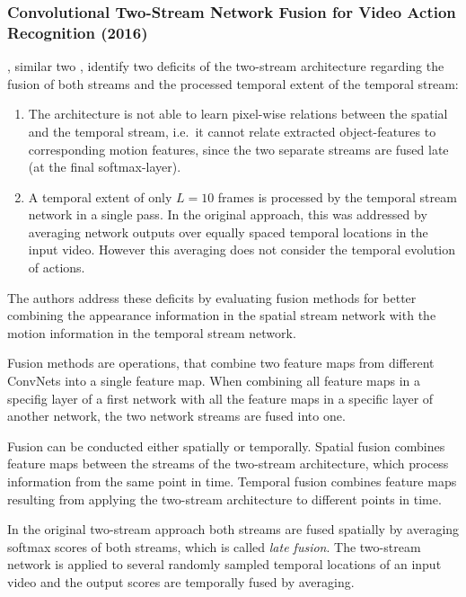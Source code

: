 \subsubsection{Convolutional Two-Stream Network Fusion for Video Action Recognition (2016)}
\textcite{feichtenhofer_convolutional_2016}, similar two \textcite{wang_towards_2015}, identify two deficits of the two-stream architecture \textcite{simonyan_two-stream_2014} regarding the fusion of both streams and the processed temporal extent of the temporal stream:
\begin{enumerate}
    \item The architecture is not able to learn pixel-wise relations between the spatial and the temporal stream, i.e.\ it cannot relate extracted object-features to corresponding motion features, since the two separate streams are fused late (at the final softmax-layer).
    \item A temporal extent of only $L = 10$ frames is processed by the temporal stream network in a single pass. In the original approach, this was addressed by averaging network outputs over equally spaced temporal locations in the input video. However this averaging does not consider the temporal evolution of actions.
\end{enumerate}

The authors address these deficits by evaluating fusion methods for better combining the appearance information in the spatial stream network with the motion information in the temporal stream network.

Fusion methods are operations, that combine two feature maps from different ConvNets into a single feature map.
When combining all feature maps in a specifig layer of a first network with all the feature maps in a specific layer of another network, the two network streams are fused into one.

Fusion can be conducted either spatially or temporally.
Spatial fusion combines feature maps between the streams of the two-stream architecture, which process information from the same point in time.
Temporal fusion combines feature maps resulting from applying the two-stream architecture to different points in time.

In the original two-stream approach \cite{simonyan_two-stream_2014} both streams are fused spatially by averaging softmax scores of both streams, which is called \textit{late fusion}.
The two-stream network is applied to several randomly sampled temporal locations of an input video and the output scores are temporally fused by averaging.

